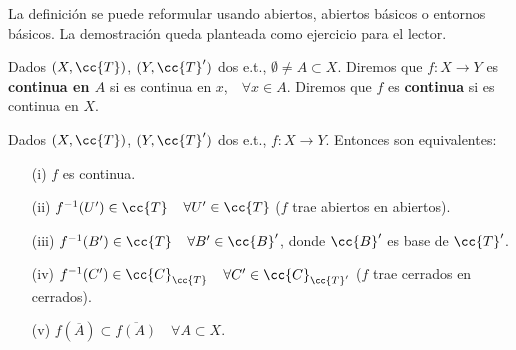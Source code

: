 \begin{observacion}
    La definición se puede reformular usando abiertos, abiertos básicos o entornos básicos. La demostración queda planteada como ejercicio para el lector. %
    \endsquare
\end{observacion}

\begin{definicion}
    Dados $(X, \cc{T})$, $(Y, \cc{T}')$ dos e.t., $\emptyset \neq A\subset X$. Diremos que $f:X\to Y$ es \textbf{continua en $A$} si es continua en $x$,\ \ $\forall x \in A$. Diremos que $f$ es \textbf{continua} si es continua en $X$.
    \endsquare
\end{definicion}

\begin{prop}
    Dados $(X, \cc{T})$, $(Y, \cc{T}')$ dos e.t., $f: X \to Y$. Entonces son equivalentes:
    \begin{enumerate}
        \item[(i)] $f$ es continua.
        \item[(ii)] $f^{-1}(U')\in \cc{T}$\ \ $\forall U' \in \cc{T}$ ($f$ trae abiertos en abiertos).
        \item[(iii)] $f^{-1}(B')\in \cc{T}$\ \ $\forall B'\in \cc{B}'$, donde $\cc{B}'$ es base de $\cc{T}'$.
        \item[(iv)] $f^{-1}(C')\in \cc{C}_{\cc{T}}$\ \ $\forall C' \in \cc{C}_{\cc{T}'}$ ($f$ trae cerrados en cerrados).
        \item[(v)] $f(\overline{A})\subset \overline{f(A)}$\ \ $\forall A \subset X$.
    \end{enumerate}


\end{prop}
